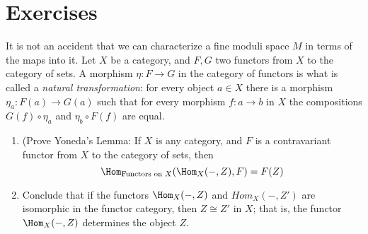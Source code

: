 \section{Exercises}
\begin{exercise}
It is not an accident that we can characterize a fine moduli space $M$ in terms of the maps into it. 
 Let $X$ be a category, and $F,G$ two functors from $X$ to the category of sets.
 A morphism $\eta: F\to G$ in the category of functors is what is called a \emph{natural transformation}:
 for every object $a\in X$ there is a morphism $\eta_a:F(a) \to G(a)$ such that for every
 morphism $f: a\to b$ in $X$ the compositions $G(f)\circ \eta_a$ and $\eta_b\circ F(f)$
 are equal. 
\begin{enumerate}
 \item (Prove Yoneda's Lemma: If $X$ is any category, and $F$ is a contravariant functor from $X$ to the category of sets, then 
 $$
 \Hom_{\hbox{\scriptsize Functors on $X$}}(\Hom_X( -, Z), F) = F(Z)
 $$
 \item Conclude that if the functors $\Hom_X( -, Z)$ and $Hom_X( -, Z')$ are isomorphic in the functor category, 
 then $Z \cong Z'$ in $X$; that is, the functor $\Hom_X( -, Z)$ determines the object $Z$.
 \end{enumerate}
\end{exercise}

%
%
%
%



